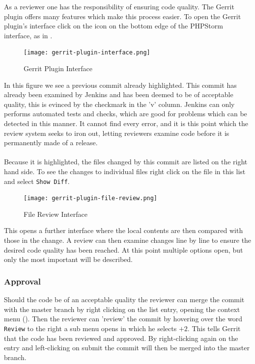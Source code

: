 As a reviewer one has the responsibility of ensuring code quality. The Gerrit plugin offers many features which make this process easier. To open the Gerrit plugin's interface click on the icon on the bottom edge of the PHPStorm interface, as in .

\newpage

\begin{figure}[h] 
	\centering
	\texttt{[image: gerrit-plugin-interface.png]}
	\caption{Gerrit Plugin Interface}
	\label{fig:gerrit-plugin-interface}
\end{figure}

\noindent
In this figure we see a previous commit already highlighted. This commit has already been examined by Jenkins and has been deemed to be of acceptable quality, this is evinced by the checkmark in the 'v' column. Jenkins can only performs automated tests and checks, which are good for problems which can be detected in this manner. It cannot find every error, and it is this point which the review system seeks to iron out, letting reviewers examine code before it is permanently made of a release.\\
\\
Because it is highlighted, the files changed by this commit are listed on the right hand side. To see the changes to individual files right click on the file in this list and select \texttt{Show Diff}.\\

\begin{figure}[h] 
	\centering
	\texttt{[image: gerrit-plugin-file-review.png]}
	\caption{File Review Interface}
	\label{fig:gerrit-plugin-file-review}
\end{figure}

\noindent
This opens a further interface where the local contents are then compared with those in the change. A review can then examine changes line by line to ensure the desired code quality has been reached. At this point multiple options open, but only the most important will be described.\\

\subsubsection{Approval}

Should the code be of an acceptable quality the reviewer can merge the commit with the master branch by right clicking on the list entry, opening the context menu (). Then the reviewer can 'review' the commit by hovering over the word \texttt{Review} to the right a sub menu opens in which he selects \texttt{$+2$}. This tells Gerrit that the code has been reviewed and approved. By right-clicking again on the entry and left-clicking on submit the commit will then be merged into the master branch.

